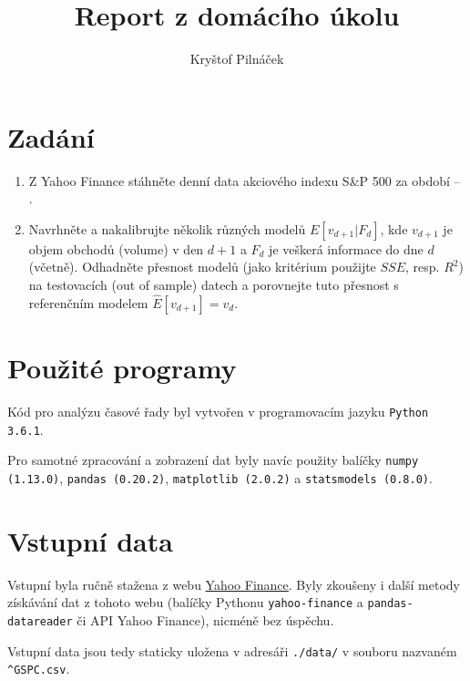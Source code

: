 \documentclass[a4paper,12pt, czech]{article}
\title{Report z domácího úkolu}
\author{Kryštof Pilnáček}
\newcommand{\code}[1]{\texttt{#1}}
\begin{document}
\maketitle

\clearpage

\section{Zadání} \label{sec:zadani}

\begin{enumerate}
	\item Z Yahoo Finance stáhněte denní data akciového indexu S\&P 500 za období  -- . \label{list:zadani_data}
	
	\item  Navrhněte a nakalibrujte několik různých modelů $E\left[v_{d+1}|F_d\right]$, kde $v_{d+1}$ je objem obchodů (volume) v den $d+1$ a $F_d$ je veškerá informace do dne $d$ (včetně). \label{list:zadani_modely}
	Odhadněte přesnost modelů (jako kritérium použijte $SSE$, resp. $R^2$) na testovacích (out of sample) datech a porovnejte tuto přesnost s referenčním modelem $\hat{E}\left[v_{d+1}\right] = v_d$.
	
\end{enumerate}

\section{Použité programy}

Kód pro analýzu časové řady byl vytvořen v programovacím jazyku \code{Python 3.6.1}.

Pro samotné zpracování a zobrazení dat byly navíc použity balíčky \code{numpy (1.13.0)}, \code{pandas (0.20.2)}, \code{matplotlib (2.0.2)} a \code{statsmodels (0.8.0)}.

\section{Vstupní data}

Vstupní byla ručně stažena z webu \href{https://finance.yahoo.com/quote/\%5EGSPC/history?period1=1262300400\&period2=1497045600\&interval=1d\&filter=history\&frequency=1d}{Yahoo Finance}.
Byly zkoušeny i další metody získávání dat z tohoto webu (balíčky Pythonu \code{yahoo-finance} a \code{pandas-datareader} či API Yahoo Finance), nicméně bez úspěchu.

Vstupní data jsou tedy staticky uložena v adresáři \code{./data/} v souboru nazvaném \code{\^{}GSPC.csv}.
\end{document}
